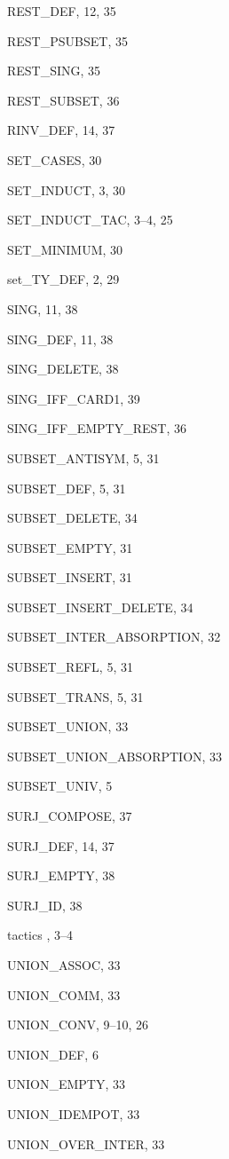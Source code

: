 \begin{theindex}
  \indexspace

  \item {\ptt REST\_DEF}, 12, 35
  \item {\ptt REST\_PSUBSET}, 35
  \item {\ptt REST\_SING}, 35
  \item {\ptt REST\_SUBSET}, 36
  \item {\ptt RINV\_DEF}, 14, 37

  \indexspace

  \item {\ptt SET\_CASES}, 30
  \item {\ptt SET\_INDUCT}, 3, 30
  \item {\ptt SET\_INDUCT\_TAC}, 3--4, 25
  \item {\ptt SET\_MINIMUM}, 30
  \item {\ptt set\_TY\_DEF}, 2, 29
  \item {\ptt SING}, 11, 38
  \item {\ptt SING\_DEF}, 11, 38
  \item {\ptt SING\_DELETE}, 38
  \item {\ptt SING\_IFF\_CARD1}, 39
  \item {\ptt SING\_IFF\_EMPTY\_REST}, 36
  \item {\ptt SUBSET\_ANTISYM}, 5, 31
  \item {\ptt SUBSET\_DEF}, 5, 31
  \item {\ptt SUBSET\_DELETE}, 34
  \item {\ptt SUBSET\_EMPTY}, 31
  \item {\ptt SUBSET\_INSERT}, 31
  \item {\ptt SUBSET\_INSERT\_DELETE}, 34
  \item {\ptt SUBSET\_INTER\_ABSORPTION}, 32
  \item {\ptt SUBSET\_REFL}, 5, 31
  \item {\ptt SUBSET\_TRANS}, 5, 31
  \item {\ptt SUBSET\_UNION}, 33
  \item {\ptt SUBSET\_UNION\_ABSORPTION}, 33
  \item {\ptt SUBSET\_UNIV}, 5
  \item {\ptt SURJ\_COMPOSE}, 37
  \item {\ptt SURJ\_DEF}, 14, 37
  \item {\ptt SURJ\_EMPTY}, 38
  \item {\ptt SURJ\_ID}, 38

  \indexspace

  \item tactics
    , 3--4

  \indexspace

  \item {\ptt UNION\_ASSOC}, 33
  \item {\ptt UNION\_COMM}, 33
  \item {\ptt UNION\_CONV}, 9--10, 26
  \item {\ptt UNION\_DEF}, 6
  \item {\ptt UNION\_EMPTY}, 33
  \item {\ptt UNION\_IDEMPOT}, 33
  \item {\ptt UNION\_OVER\_INTER}, 33

\end{theindex}
